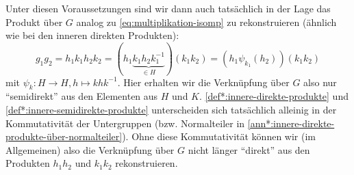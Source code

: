 \documentclass[a4paper, ngerman]{article}
\numberwithin{equation}{chapter}
\theoremstyle{plain}
\theoremstyle{definition}
\begin{document}
Unter diesen Voraussetzungen sind wir dann auch tatsächlich in der Lage das Produkt über \(G\) analog zu \eqref{eq:multiplikation-isomp} zu rekonstruieren (ähnlich wie bei den inneren direkten Produkten): 
\begin{equation}\label{eq:innere-produkt-rekonstruktion}
    g_1g_2 = h_1k_1h_2k_2 = (h_1\underbrace{k_1h_2k_1^{-1}}_{\in H})(k_1k_2) = (h_1 \psi_{k_1}(h_2))(k_1k_2)
\end{equation}
mit \(\psi_k: H \to H, h\mapsto khk^{-1}\). 
Hier erhalten wir die Verknüpfung über \(G\) also nur "`semidirekt"' aus den Elementen aus \(H\) und \(K\). \cref{def*:innere-direkte-produkte} und \cref{def*:innere-semidirekte-produkte} unterscheiden sich tatsächlich alleinig in der Kommutativität der Untergruppen (bzw. Normalteiler in \cref{ann*:innere-direkte-produkte-über-normalteiler}). 
Ohne diese Kommutativität können wir (im Allgemeinen) also die Verknüpfung über \(G\) nicht länger "`direkt"' aus den Produkten \(h_1h_2\) und \(k_1k_2\) rekonstruieren.
 
\end{document}
